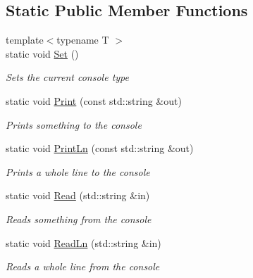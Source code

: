 \subsection*{Static Public Member Functions}
\begin{DoxyCompactItemize}
\item 
{\footnotesize template$<$typename T $>$ }\\static void \hyperlink{class_magma_1_1_console_a378572ada79137830c60c52371fcc24e}{Set} ()
\begin{DoxyCompactList}\small\item\em Sets the current console type \end{DoxyCompactList}\item 
static void \hyperlink{class_magma_1_1_console_a86389ac097431a8c5a58b0afa5251a6b}{Print} (const std\+::string \&out)
\begin{DoxyCompactList}\small\item\em Prints something to the console \end{DoxyCompactList}\item 
static void \hyperlink{class_magma_1_1_console_aa8ab1a56c768f05eab042bf76c3447e2}{Print\+Ln} (const std\+::string \&out)
\begin{DoxyCompactList}\small\item\em Prints a whole line to the console \end{DoxyCompactList}\item 
static void \hyperlink{class_magma_1_1_console_afc79ad097b46bfcf38e9bcff89f3354d}{Read} (std\+::string \&in)
\begin{DoxyCompactList}\small\item\em Reads something from the console \end{DoxyCompactList}\item 
static void \hyperlink{class_magma_1_1_console_a984a8294955770ff171817e5e228a629}{Read\+Ln} (std\+::string \&in)
\begin{DoxyCompactList}\small\item\em Reads a whole line from the console \end{DoxyCompactList}\end{DoxyCompactItemize}
